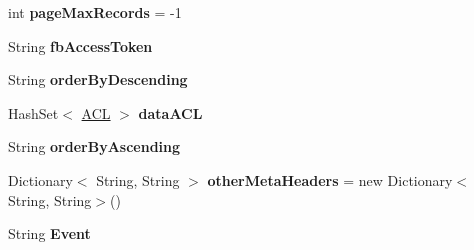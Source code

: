 \begin{DoxyCompactItemize}
\item 
\hypertarget{classcom_1_1shephertz_1_1app42_1_1paas_1_1sdk_1_1csharp_1_1_app42_service_aeaea4adf96f9c84af7a75056c31cf969}{int {\bfseries page\+Max\+Records} = -\/1}\label{classcom_1_1shephertz_1_1app42_1_1paas_1_1sdk_1_1csharp_1_1_app42_service_aeaea4adf96f9c84af7a75056c31cf969}

\item 
\hypertarget{classcom_1_1shephertz_1_1app42_1_1paas_1_1sdk_1_1csharp_1_1_app42_service_a19e2edda16ad258d7cddd92bb025bd49}{String {\bfseries fb\+Access\+Token}}\label{classcom_1_1shephertz_1_1app42_1_1paas_1_1sdk_1_1csharp_1_1_app42_service_a19e2edda16ad258d7cddd92bb025bd49}

\item 
\hypertarget{classcom_1_1shephertz_1_1app42_1_1paas_1_1sdk_1_1csharp_1_1_app42_service_ad7b588c3f5b58ff03e5ddae835352d21}{String {\bfseries order\+By\+Descending}}\label{classcom_1_1shephertz_1_1app42_1_1paas_1_1sdk_1_1csharp_1_1_app42_service_ad7b588c3f5b58ff03e5ddae835352d21}

\item 
\hypertarget{classcom_1_1shephertz_1_1app42_1_1paas_1_1sdk_1_1csharp_1_1_app42_service_a7245ccffd750de0dd4da88c3d2765aad}{Hash\+Set$<$ \hyperlink{classcom_1_1shephertz_1_1app42_1_1paas_1_1sdk_1_1csharp_1_1_a_c_l}{A\+C\+L} $>$ {\bfseries data\+A\+C\+L}}\label{classcom_1_1shephertz_1_1app42_1_1paas_1_1sdk_1_1csharp_1_1_app42_service_a7245ccffd750de0dd4da88c3d2765aad}

\item 
\hypertarget{classcom_1_1shephertz_1_1app42_1_1paas_1_1sdk_1_1csharp_1_1_app42_service_a0314a5daa5a5cbcda9f2a4c6dec6c15e}{String {\bfseries order\+By\+Ascending}}\label{classcom_1_1shephertz_1_1app42_1_1paas_1_1sdk_1_1csharp_1_1_app42_service_a0314a5daa5a5cbcda9f2a4c6dec6c15e}

\item 
\hypertarget{classcom_1_1shephertz_1_1app42_1_1paas_1_1sdk_1_1csharp_1_1_app42_service_a3a522a2c4ce13f0ca342a6a5e15ff262}{Dictionary$<$ String, String $>$ {\bfseries other\+Meta\+Headers} = new Dictionary$<$String, String$>$()}\label{classcom_1_1shephertz_1_1app42_1_1paas_1_1sdk_1_1csharp_1_1_app42_service_a3a522a2c4ce13f0ca342a6a5e15ff262}

\item 
\hypertarget{classcom_1_1shephertz_1_1app42_1_1paas_1_1sdk_1_1csharp_1_1_app42_service_a2d0c7c17998665378b747584463550ae}{String {\bfseries Event}}\label{classcom_1_1shephertz_1_1app42_1_1paas_1_1sdk_1_1csharp_1_1_app42_service_a2d0c7c17998665378b747584463550ae}

\end{DoxyCompactItemize}
